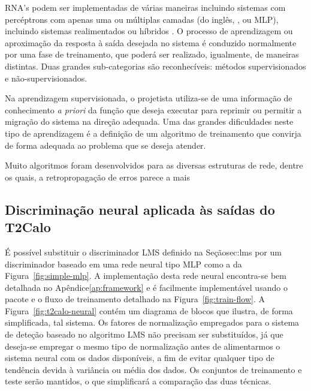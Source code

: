 
RNA's podem ser implementadas de várias maneiras incluindo sistemas com
percéptrons com apenas uma ou múltiplas camadas (do inglês, , ou MLP), incluindo sistemas realimentados ou híbridos
\cite{haykin}. O processo de aprendizagem ou aproximação da resposta à saída
desejada no sistema é conduzido normalmente por uma fase de treinamento, que
poderá ser realizado, igualmente, de maneiras distintas. Duas grandes
sub-categorias são reconhecíveis: métodos supervisionados e
não-supervisionados.

Na aprendizagem supervisionada, o projetista utiliza-se de uma informação de
conhecimento \textit{a priori} da função que deseja executar para reprimir ou
permitir a migração do sistema na direção adequada. Uma das grandes dificuldades
neste tipo de aprendizagem é a definição de um algoritmo de treinamento que
convirja de forma adequada ao problema que se deseja atender.

Muito algoritmos foram desenvolvidos para as diversas estruturas de rede,
dentre os quais, a retropropagação de erros parece a mais

\subsection{Discriminação neural aplicada às saídas do T2Calo}

É possível substituir o discriminador LMS definido na Seção{sec:lms} por um
discriminador baseado em uma rede neural tipo MLP como a da
Figura~\ref{fig:simple-mlp}. A implementação desta rede neural encontra-se bem
detalhada no Apêndice\ref{ap:framework} e é facilmente implementável usando o
pacote  e o fluxo de treinamento detalhado na
Figura~\ref{fig:train-flow}. A Figura~\ref{fig:t2calo-neural} contém um
diagrama de blocos que ilustra, de forma simplificada, tal sistema. Os fatores
de normalização empregados para o sistema de deteção baseado no algoritmo LMS
não precisam ser substituídos, já que deseja-se empregar o mesmo tipo de
normalização antes de alimentarmos o sistema neural com os dados disponíveis,
a fim de evitar qualquer tipo de tendência devida à variância ou média dos
dados. Os conjuntos de treinamento e teste serão mantidos, o que simplificará
a comparação das duas técnicas.

